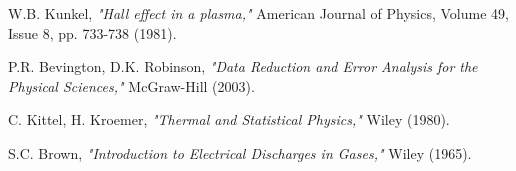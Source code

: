 \documentclass[%
 aip,
rsi,%
 amsmath,amssymb,
 reprint,%
author-numerical,%
]{revtex4-1}
\begin{document}
 \begin{thebibliography}{1}
 

 W.B. Kunkel, {\em "Hall effect in a plasma,"} American Journal of Physics, Volume 49, Issue 8, pp. 733-738 (1981). \newline

 P.R. Bevington, D.K. Robinson,  {\em "Data Reduction and Error Analysis for the Physical Sciences," } McGraw-Hill (2003). \newline

 C. Kittel, H. Kroemer,  {\em "Thermal and Statistical Physics," } Wiley (1980). \newline

 S.C. Brown,  {\em "Introduction to Electrical Discharges in Gases," } Wiley (1965). \newline


  \end{thebibliography}
  
\end{document}

